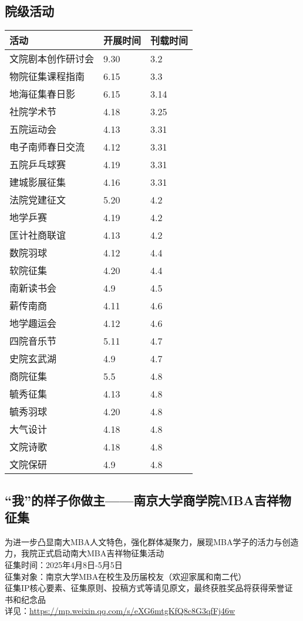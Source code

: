 \documentclass[letterpaper, 12pt]{article}
\begin{document}
\begin{multicols}{2}
\section{院级活动}
\begin{tabular}{|>{\centering\arraybackslash}m{}|m{}|m{}|}
\hline
    活动 & 开展时间 & 刊载时间\\
    \hline\hline
    文院剧本创作研讨会 & 9.30 & 3.2\\
    物院征集课程指南 & 6.15 & 3.3\\
    地海征集春日影 & 6.15 & 3.14\\
    社院学术节 & 4.18 & 3.25\\
    五院运动会 & 4.13 & 3.31\\
    电子南师春日交流 & 4.12 & 3.31\\
    五院乒乓球赛 & 4.19 & 3.31\\
    建城影展征集 & 4.16 & 3.31\\
    法院党建征文 & 5.20 & 4.2\\
    地学乒赛 & 4.19 & 4.2\\
    匡计社商联谊 & 4.13 & 4.2\\
    数院羽球 & 4.12 & 4.4\\
    软院征集 & 4.20 & 4.4\\
    南新读书会 & 4.9 & 4.5\\
    薪传南商 & 4.11 & 4.6\\
    地学趣运会 & 4.12 & 4.6\\
    四院音乐节 & 5.11 & 4.7\\
    史院玄武湖 & 4.9 & 4.7\\
    商院征集 & 5.5 & 4.8\\
    毓秀征集 & 4.13 & 4.8\\
    毓秀羽球 & 4.20 & 4.8\\
    大气设计 & 4.18 & 4.8\\
    文院诗歌 & 4.18 & 4.8\\
    文院保研 & 4.9 & 4.8\\
    \hline
\end{tabular}
\subsection{“我”的样子你做主——南京大学商学院MBA吉祥物征集}
为进一步凸显南大MBA人文特色，强化群体凝聚力，展现MBA学子的活力与创造力，我院正式启动南大MBA吉祥物征集活动
\\征集时间：2025年4月8日-5月5日
\\征集对象：南京大学MBA在校生及历届校友（欢迎家属和南二代）
\\征集IP核心要素、征集原则、投稿方式等请见原文，最终获胜奖品将获得荣誉证书和纪念品
\\详见：\url{https://mp.weixin.qq.com/s/eXG6mtgKfQ8c8G3qfFj46w}


\end{multicols}
\end{document}
